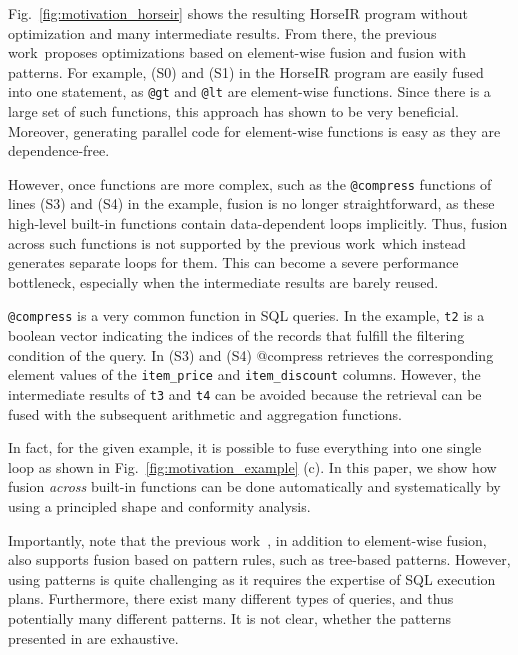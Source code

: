 Fig.~\ref{fig:motivation_horseir} shows the resulting HorseIR program without
optimization and many intermediate results. From there, the previous
work~\OldPaper proposes optimizations based on element-wise fusion and fusion
with patterns. For example, (S0) and (S1) in the HorseIR program are easily
fused into one statement, as \texttt{@gt} and \texttt{@lt} are element-wise
functions. Since there is a large set of such functions, this approach has
shown to be very beneficial. 
Moreover, generating parallel code for element-wise functions is easy as they
are dependence-free.



However, once functions are more complex, such as the \texttt{@compress}
functions of lines (S3) and (S4) in the example, fusion is no longer
straightforward, as these high-level built-in functions contain data-dependent
loops implicitly. 
Thus, fusion across such functions is not supported by the previous
work~\OldPaper which instead generates separate loops for them.
This can become a severe performance bottleneck, especially when the
intermediate results are barely reused. 

\texttt{@compress} is a very common function in SQL queries. In the example, \texttt{t2} is a boolean vector indicating the indices of the records that fulfill the filtering condition of the query. In (S3) and (S4) @compress retrieves the corresponding element values of the \texttt{item\_price} and \texttt{item\_discount} columns. However, the intermediate results of \texttt{t3} and \texttt{t4} can be avoided because the retrieval can be fused with the subsequent arithmetic and aggregation functions. 

In fact, for the given example, it is possible to fuse everything into one single loop as shown in Fig.~\ref{fig:motivation_example} (c). In this paper, we show how fusion \textit{across} built-in functions can be done automatically and systematically by using a principled shape and conformity analysis. 

Importantly, note that the previous work~\OldPaper, in addition to element-wise
fusion, also supports fusion based on pattern rules, such as tree-based
patterns. However, using patterns is quite challenging as it requires the expertise
of SQL execution plans. Furthermore, there exist many different types of
queries, and thus potentially many different patterns. It is not clear,
whether the patterns presented in \OldPaper are exhaustive. 










  



